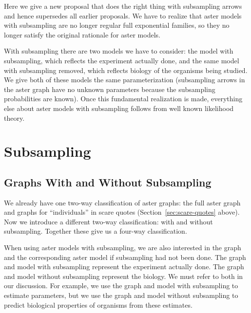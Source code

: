 Here we give a new proposal that does the right thing with subsampling
arrows and hence supersedes all earlier proposals.
We have to realize that aster models with subsampling are no longer
regular full exponential families, so they no longer satisfy the original
rationale for aster models.

With subsampling there are two models we have to consider: the model with
subsampling, which reflects the experiment actually done, and the same model
with subsampling removed, which reflects biology of the organisms being
studied.  We give both of these models the same parameterization (subsampling
arrows in the aster graph have no unknown parameters because the subsampling
probabilities are known).  Once this fundamental realization is made,
everything else about aster models with subsampling follows from well
known likelihood theory.

\section{Subsampling}

\subsection{Graphs With and Without Subsampling}
\label{sec:with-and-without}

We already have one two-way classification of aster graphs: the full aster
graph and graphs for ``individuals'' in scare quotes
(Section~\ref{sec:scare-quotes} above).  Now we introduce a different
two-way classification: with and without subsampling.  Together these give
us a four-way classification.

When using aster models with subsampling, we are also interested in the graph
and the corresponding aster model if subsampling had not been done.
The graph and model with subsampling represent the experiment actually done.
The graph and model without subsampling represent the biology.
We must refer to both in our discussion.  For example, we use the graph
and model with subsampling to estimate parameters, but we use the graph
and model without subsampling to predict biological properties of
organisms from these estimates.


